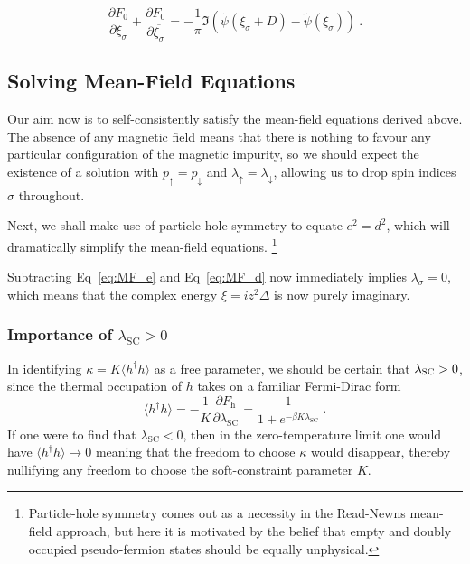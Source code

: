 \documentclass[12pt]{article}
\begin{document}
\begin{equation}
\frac{\partial F_{0}}{\partial \xi_{\sigma}} + \frac{\partial F_{0}}{\partial \overline{\xi_{\sigma}}} = - \frac{1}{\pi} \Im{( \widetilde{\psi}(\xi_{\sigma} + D) - \widetilde{\psi}(\xi_{\sigma}))} ~ .
\end{equation}




\subsection{Solving Mean-Field Equations}

Our aim now is to self-consistently satisfy the mean-field equations derived above. The absence of any magnetic field means that there is nothing to favour any particular configuration of the magnetic impurity, so we should expect the existence of a solution with $ p_{\uparrow} = p_{\downarrow} $ and $ \lambda_{\uparrow} = \lambda_{\downarrow} $, allowing us to drop spin indices $ \sigma $ throughout.

Next, we shall make use of particle-hole symmetry to equate $ e^2 = d^2 $, which will dramatically simplify the mean-field equations. \footnote{Particle-hole symmetry comes out as a necessity in the Read-Newns mean-field approach, but here it is motivated by the belief that empty and doubly occupied pseudo-fermion states should be equally unphysical.}

Subtracting Eq~\eqref{eq:MF_e} and Eq~\eqref{eq:MF_d} now immediately implies $ \lambda_{\sigma} = 0 $, which means that the complex energy $ \xi = i z^2 \Delta $ is now purely imaginary.


\subsubsection{Importance of $ \lambda_{\text{SC}} > 0 $}

In identifying $ \kappa = K \langle h^{\dagger} h \rangle $ as a free parameter, we should be certain that $ \lambda_{\textsc{SC}} > 0 $, since the thermal occupation of $ h $ takes on a familiar Fermi-Dirac form $$ \langle h^{\dagger} h \rangle = - \frac{1}{K} \frac{\partial F_{\text{h}}}{\partial \lambda_{\text{SC}}} = \frac{1}{1 + e^{- \beta K \lambda_{\text{SC}}}} ~. $$ If one were to find that $ \lambda_{\text{SC}} < 0 $, then in the zero-temperature limit one would have $ \langle h^{\dagger} h \rangle \rightarrow 0 $ meaning that the freedom to choose $ \kappa $ would disappear, thereby nullifying any freedom to choose the soft-constraint parameter $ K $.
\end{document}
